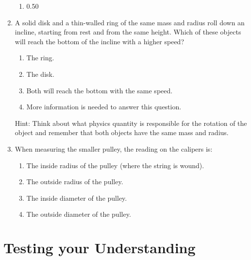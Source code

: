 \begin{enumerate}
\begin{enumerate}
  \item  0.50\,\radian\per\second
  \end{enumerate}
\item A solid disk and a thin-walled ring of the same mass and radius roll down an incline, starting from rest and from the same height. Which of these objects will reach the bottom of the incline with a higher speed?
  \begin{enumerate}
  \item The ring.
  \item The disk.
  \item Both will reach the bottom with the same speed.
  \item More information is needed to answer this question.
  \end{enumerate}
  Hint: Think about what physics quantity is responsible for the rotation of the object and remember that both objects have the same mass and radius.
\item When measuring the smaller pulley, the reading on the calipers is:
  \begin{enumerate}
  \item The inside radius of the pulley (where the string is wound).
  \item The outside radius of the pulley.
  \item The inside diameter of the pulley.
  \item The outside diameter of the pulley.
  \end{enumerate}
\end{enumerate}








\section{Testing your Understanding}

